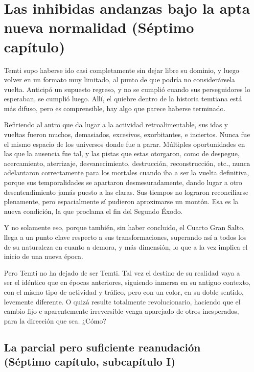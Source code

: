 \documentclass[
  spanish,
]{book}
\begin{document}
\hypertarget{las-inhibidas-andanzas-bajo-la-apta-nueva-normalidad-suxe9ptimo-capuxedtulo}{%
\chapter{Las inhibidas andanzas bajo la apta nueva normalidad (Séptimo capítulo)}\label{las-inhibidas-andanzas-bajo-la-apta-nueva-normalidad-suxe9ptimo-capuxedtulo}}

Temti supo haberse ido casi completamente sin dejar libre su dominio, y luego volver en un formato muy limitado, al punto de que podría no considerársela vuelta. Anticipó un supuesto regreso, y no se cumplió cuando sus perseguidores lo esperaban, se cumplió luego. Allí, el quiebre dentro de la historia temtiana está más difuso, pero es comprensible, hay algo que parece haberse terminado.

Refiriendo al antro que da lugar a la actividad retroalimentable, sus idas y vueltas fueron muchos, demasiados, excesivos, exorbitantes, e inciertos. Nunca fue el mismo espacio de los universos donde fue a parar. Múltiples oportunidades en las que la ausencia fue tal, y las pistas que estas otorgaron, como de despegue, acercamiento, aterrizaje, desvanecimiento, destrucción, reconstrucción, etc., nunca adelantaron correctamente para los mortales cuando iba a ser la vuelta definitiva, porque sus temporalidades se apartaron desmesuradamente, dando lugar a otro desentendimiento jamás puesto a las claras. Sus tiempos no lograron reconciliarse plenamente, pero espacialmente sí pudieron aproximarse un montón. Esa es la nueva condición, la que proclama el fin del Segundo Éxodo.

Y no solamente eso, porque también, sin haber concluido, el Cuarto Gran Salto, llega a un punto clave respecto a sus transformaciones, superando así a todos los de su naturaleza en cuanto a demora, y más dimensión, lo que a la vez implica el inicio de una nueva época.

Pero Temti no ha dejado de ser Temti. Tal vez el destino de su realidad vaya a ser el idéntico que en épocas anteriores, siguiendo inmersa en su antiguo contexto, con el mismo tipo de actividad y tráfico, pero con un color, en su doble sentido, levemente diferente. O quizá resulte totalmente revolucionario, haciendo que el cambio fijo e aparentemente irreversible venga aparejado de otros inesperados, para la dirección que sea. ¿Cómo?

\hypertarget{la-parcial-pero-suficiente-reanudaciuxf3n-suxe9ptimo-capuxedtulo-subcapuxedtulo-i}{%
\section{La parcial pero suficiente reanudación (Séptimo capítulo, subcapítulo I)}\label{la-parcial-pero-suficiente-reanudaciuxf3n-suxe9ptimo-capuxedtulo-subcapuxedtulo-i}}
\end{document}
